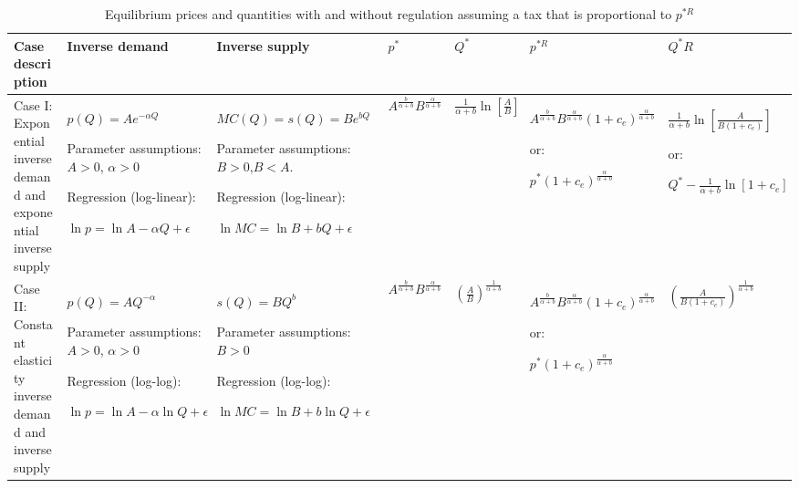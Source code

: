 \documentclass[
]{book}
\begin{document}
\begin{table}

\caption{\label{tab:priceregulation}Equilibrium prices and quantities with and without regulation assuming a tax that is proportional to $p^{\ast R}$}
\centering
\fontsize{10}{12}\selectfont
\begin{tabular}[t]{lllllll}
\toprule
Case description & Inverse demand & Inverse supply & $p^\ast$ & $Q^\ast$ & $p^{\ast R}$ & $Q^\ast R$\\
\midrule
Case I: Exponential inverse demand and exponential inverse supply & $p(Q)=Ae^{-\alpha Q}$

Parameter assumptions:
$A>0$, $\alpha>0$

Regression (log-linear):

$\ln p = \ln A - \alpha Q + \epsilon$ & $MC(Q) = s(Q)=Be^{bQ}$

Parameter assumptions:
$B>0$,$B<A$.

Regression (log-linear):

$\ln MC = \ln B  +b Q + \epsilon$ & $A^{\frac{b}{\alpha + b}}B^{\frac{\alpha}{\alpha + b}}$ & $\frac{1}{\alpha + b} \ln \left[\frac{A}{B}\right]$ & $A^{\frac{b}{\alpha + b}}B^{\frac{\alpha}{\alpha + b}} \left(1 + c_e\right)^{\frac{\alpha}{\alpha + b}}$

  or:

  $p^\ast \left(1 + c_e\right)^{\frac{\alpha}{\alpha + b}}$ & $\frac{1}{\alpha + b} \ln \left[\frac{A}{B(1 + c_e)} \right]$

  or:

  $Q^\ast - \frac{1}{\alpha + b} \ln [1 + c_e]$\\
Case II: Constant elasticity inverse demand and inverse supply & $p(Q) = AQ^{-\alpha}$

Parameter assumptions:
$A>0$, $\alpha>0$

Regression (log-log):

$\ln p = \ln A - \alpha \ln Q + \epsilon$ & $s(Q)=BQ^b$

Parameter assumptions:
$B>0$

Regression (log-log):

$\ln MC = \ln B + b \ln Q + \epsilon$ & $A^{\frac{b}{\alpha + b}}B^{\frac{\alpha}{\alpha + b}}$ & $\left(\frac{A}{B}\right)^{\frac{1}{\alpha + b}}$ & $A^{\frac{b}{\alpha + b}}B^{\frac{\alpha}{\alpha + b}} \left(1 + c_e\right)^{\frac{\alpha}{\alpha + b}}$

  or:

  $p^\ast \left(1 + c_e\right)^{\frac{\alpha}{\alpha + b}}$ & $\left(\frac{A}{B(1 + c_e)} \right)^\frac{1}{\alpha + b}$


\end{tabular}
\end{table}
\end{document}
